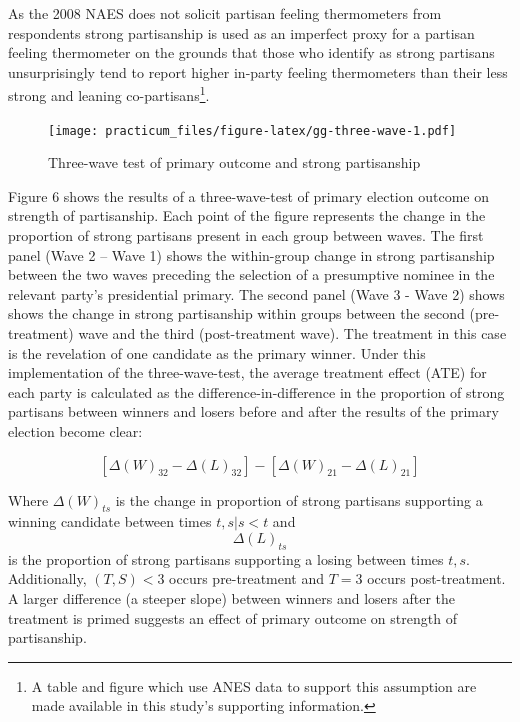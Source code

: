 \documentclass[
]{article}
\begin{document}
As the 2008 NAES does not solicit partisan feeling thermometers from respondents strong partisanship is used as an imperfect proxy for a partisan feeling thermometer on the grounds that those who identify as strong partisans unsurprisingly tend to report higher in-party feeling thermometers than their less strong and leaning co-partisans\footnote{A table and figure which use ANES data to support this assumption are made available in this study's supporting information.}.

\begin{figure}
\centering
\texttt{[image: practicum\_files/figure-latex/gg-three-wave-1.pdf]}
\caption{\label{fig:gg-three-wave}Three-wave test of primary outcome and strong partisanship}
\end{figure}

Figure 6 shows the results of a three-wave-test of primary election outcome on strength of partisanship. Each point of the figure represents the change in the proportion of strong partisans present in each group between waves. The first panel (Wave 2 -- Wave 1) shows the within-group change in strong partisanship between the two waves preceding the selection of a presumptive nominee in the relevant party's presidential primary. The second panel (Wave 3 - Wave 2) shows shows the change in strong partisanship within groups between the second (pre-treatment) wave and the third (post-treatment wave). The treatment in this case is the revelation of one candidate as the primary winner. Under this implementation of the three-wave-test, the average treatment effect (ATE) for each party is calculated as the difference-in-difference in the proportion of strong partisans between winners and losers before and after the results of the primary election become clear:

\[
[\Delta(W)_{32} - \Delta(L)_{32}]-[\Delta(W)_{21} - \Delta(L)_{21}] 
\]

Where \(\Delta(W)_{ts}\) is the change in proportion of strong partisans supporting a winning candidate between times \(t, s | s<t\) and \[\Delta(L)_{ts}\] is the proportion of strong partisans supporting a losing between times \(t, s\). Additionally, \((T,S) < 3\) occurs pre-treatment and \(T=3\) occurs post-treatment. A larger difference (a steeper slope) between winners and losers after the treatment is primed suggests an effect of primary outcome on strength of partisanship.
\end{document}
